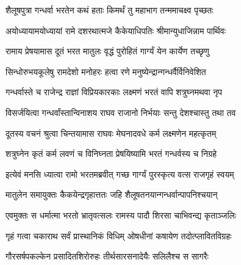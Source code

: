 
\textlink{}
\translink{}

\storymeta



\twolineshloka
{शैलूषपुत्रा गन्धर्वा भरतेन कथं हताः}
{किमर्थं तु महाभाग तन्ममाचक्ष्व पृच्छतः}%


\twolineshloka
{अयोध्यायामयोध्यायां रामे दशरथात्मजे}
{कैकेयाधिपतिः श्रीमान्युधाजिन्नाम पार्थिवः}%

\twolineshloka
{रामाय प्रेषयामास दूतं भरत मातुलः}
{वृद्धं पुरोहितं गार्ग्यं येन कार्येण तच्छृणु}%

\twolineshloka
{सिन्धोरुभयकूलेषु रामदेशो मनोहरः}
{हत्वा रणे मनुष्येन्द्रान्गन्धर्वैर्विनिवेशित}%

\twolineshloka
{गन्धर्वास्ते च राजेन्द्र राज्ञां विप्रियकारकाः}
{लक्ष्मणं भरतं वापि शत्रुघ्नमथवा नृप}%

\twolineshloka
{विसर्जयित्वा गन्धर्वांस्तान्विनाशय राघव}
{राजानो निर्भयाः सन्तु देशश्चास्तु तथा तव}%

\twolineshloka
{दूतस्य वचनं श्रुत्वा चिन्तयामास राघवः}
{मेघनादवधे कर्म लक्ष्मणेन महत्कृतम्}%

\twolineshloka
{शत्रुघ्नेन कृतं कर्म लवणं च विनिघ्नता}
{प्रेषयिष्यामि भरतं गन्धर्वस्य च निग्रहे}%

\twolineshloka
{इत्येवं मनसि ध्यात्वा रामो भरतमब्रवीत्}
{गच्छ गार्ग्यं पुरस्कृत्य वत्स राजगृहं स्वयम्}%

\twolineshloka
{मातुलेन समायुक्तः कैकयेन्द्रगृहात्ततः}
{जहि शैलूषतनयान्गन्धर्वान्पापनिश्चयान्}%

\twolineshloka
{एवमुक्तः स धर्मात्मा भरतो भ्रातृवत्सलः}
{रामस्य पादौ शिरसा चाभिवन्द्य कृताञ्जलिः}%

\twolineshloka
{गृहं गत्वा चकाराथ सर्वं प्रास्थानिकं विधिम्}
{ओषधीनां कषायेण तदोत्प्लावितविग्रहः}%

\twolineshloka
{गौरसर्षपकल्केन प्रसादितशिरोरुहः}
{तीर्थसारसनादेयैः सलिलैश्च स सागरैः}%

